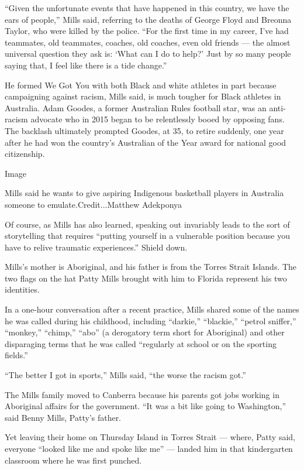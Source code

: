 ``Given the unfortunate events that have happened in this country, we
have the ears of people,'' Mills said, referring to the deaths of George
Floyd and Breonna Taylor, who were killed by the police. ``For the first
time in my career, I've had teammates, old teammates, coaches, old
coaches, even old friends --- the almost universal question they ask is:
`What can I do to help?' Just by so many people saying that, I feel like
there is a tide change.''

He formed We Got You with both Black and white athletes in part because
campaigning against racism, Mills said, is much tougher for Black
athletes in Australia. Adam Goodes, a former Australian Rules football
star, was an anti-racism advocate who in 2015 began to be relentlessly
booed by opposing fans. The backlash ultimately prompted Goodes, at 35,
to retire suddenly, one year after he had won the country's Australian
of the Year award for national good citizenship.

Image

Mills said he wants to give aspiring Indigenous basketball players in
Australia someone to emulate.Credit...Matthew Adekponya

Of course, as Mills has also learned, speaking out invariably leads to
the sort of storytelling that requires ``putting yourself in a
vulnerable position because you have to relive traumatic experiences.''
Shield down.

Mills's mother is Aboriginal, and his father is from the Torres Strait
Islands. The two flags on the hat Patty Mills brought with him to
Florida represent his two identities.

In a one-hour conversation after a recent practice, Mills shared some of
the names he was called during his childhood, including ``darkie,''
``blackie,'' ``petrol sniffer,'' ``monkey,'' ``chimp,'' ``abo'' (a
derogatory term short for Aboriginal) and other disparaging terms that
he was called ``regularly at school or on the sporting fields.''

``The better I got in sports,'' Mills said, ``the worse the racism
got.''

The Mills family moved to Canberra because his parents got jobs working
in Aboriginal affairs for the government. ``It was a bit like going to
Washington,'' said Benny Mills, Patty's father.

Yet leaving their home on Thursday Island in Torres Strait --- where,
Patty said, everyone ``looked like me and spoke like me'' --- landed him
in that kindergarten classroom where he was first punched.

